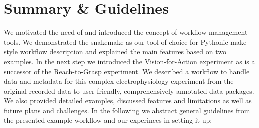 \section{Summary \& Guidelines}
\label{sec:guidelines}
We motivated the need of and introduced the concept of workflow management tools. We demonstrated the snakemake as our tool of choice for Pythonic make-style workflow description and explained the main features based on two examples. In the next step we introduced the Vision-for-Action experiment as is a successor of the Reach-to-Grasp experiment. We described a workflow to handle data and metadata for this complex electrophysiology experiment from the original recorded data to user friendly, comprehensively annotated data packages. We also provided detailed examples, discussed features and limitations as well as future plans and challenges. In the following we abstract general guidelines from the presented example workflow and our experinces in setting it up:

